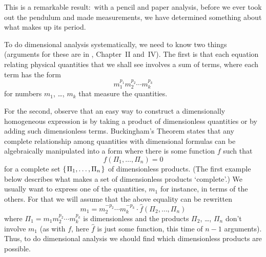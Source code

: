 This is a remarkable result:~with a pencil and paper analysis,
before we ever took out the pendulum and made measurements,
we have determined something about what makes up its period. 

To do dimensional analysis systematically, we need to know two things
(arguments for these are in \cite{Bridgman}, Chapter~II and~IV).
The first is that each equation relating physical 
quantities that we shall see involves a sum of terms, 
where each term has the form
\begin{equation*}
  m_1^{p_1}m_2^{p_2}\cdots m_k^{p_k}
\end{equation*}
for numbers $m_1$, \ldots, $m_k$ that measure the quantities.

For the second, observe that an easy way to construct a dimensionally
homogeneous expression is by taking a product of dimensionless quantities
or by adding such dimensionless terms.
Buckingham's Theorem states that any
complete relationship among quantities with 
dimensional formulas can be algebraically manipulated into a form where
there is some function $f$ such that
\begin{equation*}
  f(\Pi_1,\ldots,\Pi_n)=0
\end{equation*}
for a complete set $\mbox{$\{\hspace{0.1em}\Pi_1,\ldots,\Pi_n\hspace{0.1em}\}$}$ of dimensionless products.
(The first example below describes what makes a set of dimensionless 
products `complete'.)
We usually want to express one of the quantities, 
$m_1$ for instance, in terms of the others. 
For that we will assume that the above equality can be rewritten 
\begin{equation*}
  m_1=m_2^{-p_2}\cdots m_k^{-p_k}\cdot \hat{f}(\Pi_2,\ldots,\Pi_n)
\end{equation*}
where $\Pi_1=m_1m_2^{p_2}\cdots m_k^{p_k}$ is dimensionless
and the products $\Pi_2$, \ldots, $\Pi_n$ don't involve $m_1$
(as with $f$, here $\hat{f}$ is just some function, this time 
of $n-1$ arguments).
Thus, to do dimensional analysis we should
find which dimensionless products are possible.

